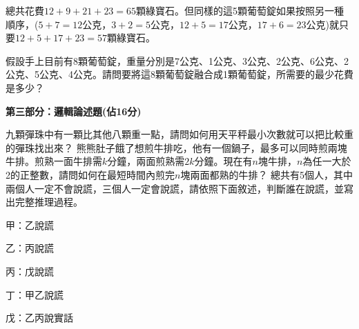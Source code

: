 \documentclass[a4paper, 12pt, addpoints]{exam}
\begin{document}
\begin{questions}
    總共花費$12+9+21+23=65$顆綠寶石。但同樣的這5顆葡萄錠如果按照另一種順序，($5+7=12$公克，$3+2=5$公克，$12+5=17$公克，$17+6=23$公克)就只要$12+5+17+23=57$顆綠寶石。

    假設手上目前有8顆葡萄錠，重量分別是7公克、1公克、3公克、2公克、6公克、2公克、5公克、4公克。請問要將這8顆葡萄錠融合成1顆葡萄錠，所需要的最少花費是多少？

\end{questions}


\newpage
\noindent \textbf{\large 第三部分：邏輯論述題(佔16分)}

\noindent {}%


\vspace{0.1in}
\begin{questions}
    \question[6]
    九顆彈珠中有一顆比其他八顆重一點，請問如何用天平秤最小次數就可以把比較重的彈珠找出來？
    \question[3]
    熊熊肚子餓了想煎牛排吃，他有一個鍋子，最多可以同時煎兩塊牛排。煎熟一面牛排需$k$分鐘，兩面煎熟需$2k$分鐘。現在有$n$塊牛排，$n$為任一大於2的正整數，請問如何在最短時間內煎完$n$塊兩面都熟的牛排？
    \question[7]
    總共有5個人，其中兩個人一定不會說謊，三個人一定會說謊，請依照下面敘述，判斷誰在說謊，並寫出完整推理過程。

    甲：乙說謊

    乙：丙說謊

    丙：戊說謊

    丁：甲乙說謊

    戊：乙丙說實話


\end{questions}
\end{document}
